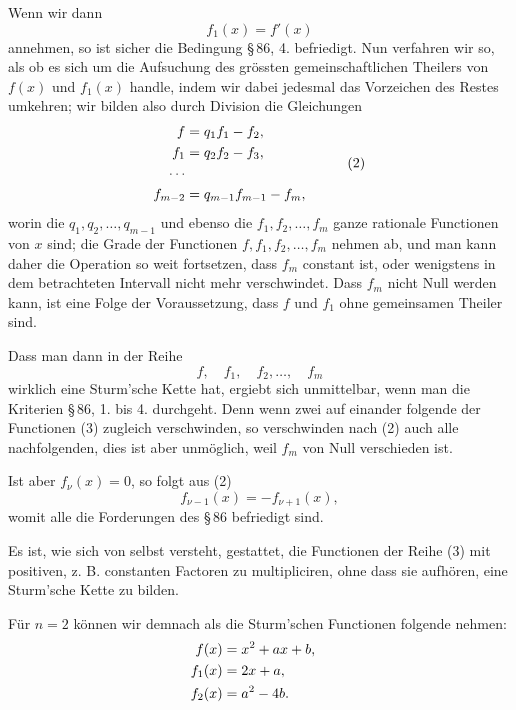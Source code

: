 \documentclass[11pt]{article}
\begin{document}
Wenn wir dann
\begin{equation}
        f_1(x)=f'(x)
\tag{1}
\end{equation}
annehmen, so ist sicher die Bedingung \S\,86, 4. befriedigt. Nun verfahren wir so, als ob es sich um die Aufsuchung des gr\"ossten gemeinschaftlichen Theilers von $f(x)$ und $f_1(x)$ handle, indem wir dabei jedesmal das Vorzeichen des Restes umkehren; wir bilden also durch Division die Gleichungen
\begin{equation}
\begin{aligned}
        f&=q_1f_1-f_2,
        \cr
        f_1&=q_2f_2-f_3,
        \cr
        \cdots&
        \cr
        f_{m-2}&=q_{m-1}f_{m-1}-f_m,
\end{aligned}
\tag{2}
\end{equation}
worin die $q_1,q_2,
\ldots,q_{m-1}$ und ebenso die $f_1,f_2,
\ldots,f_m$ ganze rationale Functionen von $x$ sind; die Grade der Functionen $f,f_1,f_2,
\ldots,f_m$ nehmen ab, und man kann daher die Operation so weit fortsetzen, dass $f_m$ constant ist, oder wenigstens in dem betrachteten Intervall nicht mehr verschwindet. Dass $f_m$ nicht Null werden kann, ist eine Folge der Voraussetzung, dass $f$ und $f_1$ ohne gemeinsamen Theiler sind.

Dass man dann in der Reihe
\begin{equation}
        f,
        \quad f_1,
        \quad f_2,
        \ldots,
        \quad f_m
\tag{3}
\end{equation}
wirklich eine Sturm'sche Kette hat, ergiebt sich unmittelbar, wenn man die Kriterien \S\,86, 1. bis 4. durchgeht. Denn wenn zwei auf einander folgende der Functionen (3) zugleich verschwinden, so verschwinden nach (2) auch alle nachfolgenden, dies ist aber unm\"oglich, weil $f_m$ von Null verschieden ist.

Ist aber $f_\nu(x)=0$, so folgt aus (2)
\[
        f_{\nu-1}(x)=-f_{\nu+1}(x),
\]
womit alle die Forderungen des \S\,86 befriedigt sind.

Es ist, wie sich von selbst versteht, gestattet, die Functionen der Reihe (3) mit positiven, z. B. constanten Factoren zu multipliciren, ohne dass sie aufh\"oren, eine Sturm'sche Kette zu bilden.

F\"ur $n=2$ k\"onnen wir demnach als die Sturm'schen Functionen folgende nehmen:
\[
\begin{aligned}
        f(x)&=x^2+ax+b,\cr
        f_1(x)&=2x+a,\cr
        f_2(x)&=a^2-4b.
\end{aligned}
\]
\end{document}

